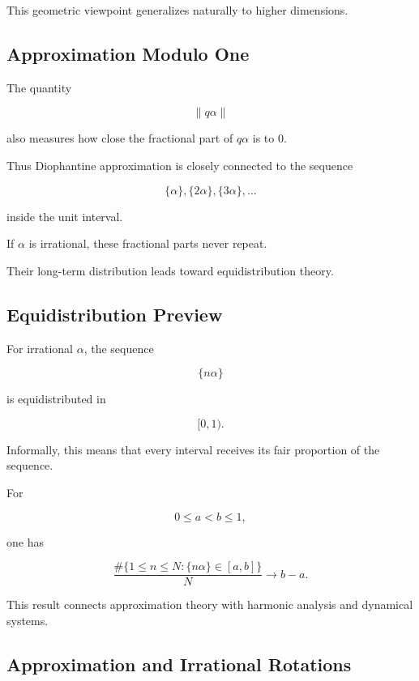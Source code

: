 This geometric viewpoint generalizes naturally to higher dimensions.

\subsection{Approximation Modulo One}
\label{subsec:approximation-modulo-one}

The quantity

\[ \|q\alpha\| \]

also measures how close the fractional part of \(q\alpha\) is to \(0\).

Thus Diophantine approximation is closely connected to the sequence

\[ \{\alpha\},\{2\alpha\},\{3\alpha\},\ldots \]

inside the unit interval.

If \(\alpha\) is irrational, these fractional parts never repeat.

Their long-term distribution leads toward equidistribution theory.

\subsection{Equidistribution Preview}
\label{subsec:equidistribution-preview}

For irrational \(\alpha\), the sequence

\[ \{n\alpha\} \]

is equidistributed in

\[ [0,1). \]

Informally, this means that every interval receives its fair proportion of
the sequence.

For

\[ 0\leq a<b\leq1, \]

one has

\[
\frac{
\#\{1\leq n\leq N:\{n\alpha\}\in[a,b]\}
}{N}
\to b-a.
\]

This result connects approximation theory with harmonic analysis and
dynamical systems.

\subsection{Approximation and Irrational Rotations}
\label{subsec:irrational-rotations}


